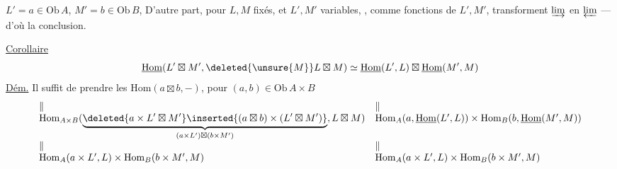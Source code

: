 $L'=a\in\mathrm{Ob}\,A$, $M'=b\in\mathrm{Ob}\,B$,  D'autre part, pour $L,M$ fixés, et $L',M'$ variables, , comme fonctions de $L',M'$, transforment $\varinjlim$ en $\varprojlim$
 
--- d'où la conclusion.

\uline{Corollaire}
\[
\underline{\mathrm{Hom}}(L'\boxtimes M',\deleted{\unsure{M}}L\boxtimes M)\simeq\underline{\mathrm{Hom}}(L',L)\boxtimes\underline{\mathrm{Hom}}(M',M)
\]
\uline{Dém.} Il suffit de prendre les $\mathrm{Hom}(a\boxtimes b,-)$, pour $(a,b)\in\mathrm{Ob}\,A\times B$
\[
\begin{array}{ll}
\Vert&\Vert\\
\mathrm{Hom}_{A\times B}(\underbrace{\deleted{a\times L'\boxtimes M'}\inserted{(a\boxtimes b)\times(L'\boxtimes M')}}_{(a\times L')\boxtimes(b\times M')},L\boxtimes M)&\mathrm{Hom}_A(a,\underline{\mathrm{Hom}}(L',L))\times\mathrm{Hom}_B(b,\underline{\mathrm{Hom}}(M',M))\\
\Vert&\Vert\\
\mathrm{Hom}_A(a\times L',L)\times\mathrm{Hom}_B(b\times M',M)&\mathrm{Hom}_A(a\times L',L)\times\mathrm{Hom}_B(b\times M',M)
\end{array}
\]

